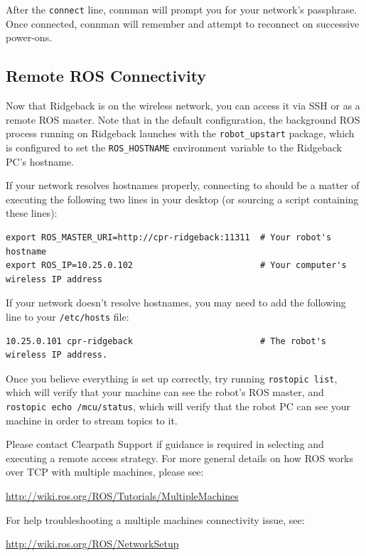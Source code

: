 \documentclass[]{clearpath-latex/clearpath-manual}
\begin{document}
After the \lstinline{connect} line, connman will prompt you for your network's passphrase. Once connected, connman will remember and attempt to reconnect on successive power-ons.

\subsection{Remote ROS Connectivity}

Now that Ridgeback is on the wireless network, you can access it via SSH or as a remote ROS master. Note that in the default configuration, the background ROS process running on Ridgeback launches with the \lstinline{robot_upstart} package, which is configured to set the \lstinline{ROS_HOSTNAME} environment variable to the Ridgeback PC's hostname.

If your network resolves hostnames properly, connecting to should be a matter of executing the following two lines in your desktop (or sourcing a script containing these lines):

\begin{lstlisting}
export ROS_MASTER_URI=http://cpr-ridgeback:11311  # Your robot's hostname
export ROS_IP=10.25.0.102                         # Your computer's wireless IP address
\end{lstlisting}

If your network doesn't resolve hostnames, you may need to add the following line to your \lstinline{/etc/hosts} file:

\begin{lstlisting}
10.25.0.101 cpr-ridgeback                         # The robot's wireless IP address.
\end{lstlisting}

Once you believe everything is set up correctly, try running \lstinline{rostopic list}, which will verify that your machine can see the robot's ROS master, and \lstinline{rostopic echo /mcu/status}, which will verify that the robot PC can see your machine in order to stream topics to it.

Please contact Clearpath Support if guidance is required in selecting and executing a remote access strategy.
For more general details on how ROS works over TCP with multiple machines, please see:

\url{http://wiki.ros.org/ROS/Tutorials/MultipleMachines}

For help troubleshooting a multiple machines connectivity issue, see:

\url{http://wiki.ros.org/ROS/NetworkSetup}
\end{document}
